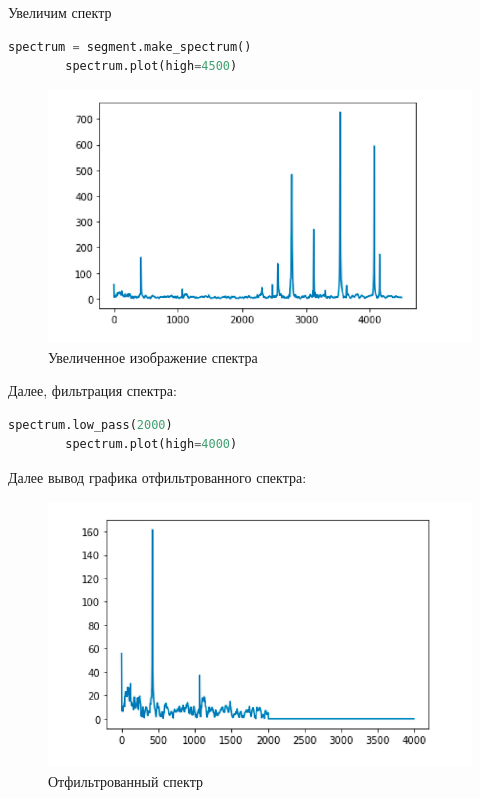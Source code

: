 \documentclass[a4]{article}
\begin{document}
    Увеличим спектр

    \begin{lstlisting}[language=Python, caption= Приближенное изображение спектра, label={lst:zoom_spectr}]
        spectrum = segment.make_spectrum()
        spectrum.plot(high=4500)
    \end{lstlisting}

    \begin{figure}[H]
        \centering
        \includegraphics[width=\textwidth]{zoomed_spectr}
        \caption{Увеличенное изображение спектра}
        \label{fig:zoomed_spectr}
    \end{figure}

    Далее, фильтрация спектра:

    \begin{lstlisting}[language=Python, caption= Фильтрация спектра, label={lst:filter_spectr}]
        spectrum.low_pass(2000)
        spectrum.plot(high=4000)
    \end{lstlisting}

    Далее вывод графика отфильтрованного спектра:

    \begin{figure}[H]
        \centering
        \includegraphics[width=\textwidth]{filtered_spectr}
        \caption{Отфильтрованный спектр}
        \label{fig:spectr_filter}
    \end{figure}
\end{document}
